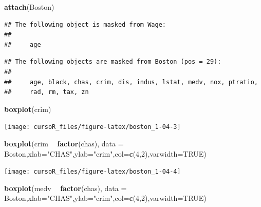 \documentclass[]{book}
\newenvironment{Shaded}{\begin{snugshade}}{\end{snugshade}}
\newcommand{\KeywordTok}[1]{\textcolor[rgb]{0.13,0.29,0.53}{\textbf{#1}}}
\newcommand{\DataTypeTok}[1]{\textcolor[rgb]{0.13,0.29,0.53}{#1}}
\newcommand{\DecValTok}[1]{\textcolor[rgb]{0.00,0.00,0.81}{#1}}
\newcommand{\StringTok}[1]{\textcolor[rgb]{0.31,0.60,0.02}{#1}}
\newcommand{\OtherTok}[1]{\textcolor[rgb]{0.56,0.35,0.01}{#1}}
\newcommand{\OperatorTok}[1]{\textcolor[rgb]{0.81,0.36,0.00}{\textbf{#1}}}
\newcommand{\NormalTok}[1]{#1}
\begin{document}
\begin{Shaded}
\begin{Highlighting}[]
\KeywordTok{attach}\NormalTok{(Boston)}
\end{Highlighting}
\end{Shaded}

\begin{verbatim}
## The following object is masked from Wage:
## 
##     age
\end{verbatim}

\begin{verbatim}
## The following objects are masked from Boston (pos = 29):
## 
##     age, black, chas, crim, dis, indus, lstat, medv, nox, ptratio,
##     rad, rm, tax, zn
\end{verbatim}

\begin{Shaded}
\begin{Highlighting}[]
\KeywordTok{boxplot}\NormalTok{(crim)}
\end{Highlighting}
\end{Shaded}

\begin{center}\texttt{[image: cursoR\_files/figure-latex/boston\_1-04-3]} \end{center}

\begin{Shaded}
\begin{Highlighting}[]
\KeywordTok{boxplot}\NormalTok{(crim }\OperatorTok{~}\StringTok{ }\KeywordTok{factor}\NormalTok{(chas), }\DataTypeTok{data =}\NormalTok{ Boston,}\DataTypeTok{xlab=}\StringTok{"CHAS"}\NormalTok{,}\DataTypeTok{ylab=}\StringTok{"crim"}\NormalTok{,}\DataTypeTok{col=}\KeywordTok{c}\NormalTok{(}\DecValTok{4}\NormalTok{,}\DecValTok{2}\NormalTok{),}\DataTypeTok{varwidth=}\OtherTok{TRUE}\NormalTok{)}
\end{Highlighting}
\end{Shaded}

\begin{center}\texttt{[image: cursoR\_files/figure-latex/boston\_1-04-4]} \end{center}

\begin{Shaded}
\begin{Highlighting}[]
\KeywordTok{boxplot}\NormalTok{(medv }\OperatorTok{~}\StringTok{ }\KeywordTok{factor}\NormalTok{(chas), }\DataTypeTok{data =}\NormalTok{ Boston,}\DataTypeTok{xlab=}\StringTok{"CHAS"}\NormalTok{,}\DataTypeTok{ylab=}\StringTok{"crim"}\NormalTok{,}\DataTypeTok{col=}\KeywordTok{c}\NormalTok{(}\DecValTok{4}\NormalTok{,}\DecValTok{2}\NormalTok{),}\DataTypeTok{varwidth=}\OtherTok{TRUE}\NormalTok{)}
\end{Highlighting}
\end{Shaded}
\end{document}
